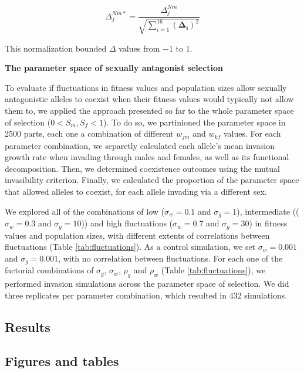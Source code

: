 \documentclass[]{article}
\begin{document}
\begin{equation}
  \Delta^{Nm*}_{j}= \frac{\Delta^{Nm}_{j}}{\sqrt{
    \sum\limits_{i=1}^{16} (\boldsymbol{\Delta_{i}})^{2} }}
\end{equation}

This normalization bounded $\Delta$ values from $-1$ to $1$.

\vspace{5mm}
\noindent\textbf{The parameter space of sexually antagonist selection}

To evaluate if fluctuations in fitness values and population sizes allow sexually antagonistic alleles to coexist when their fitness values would typically not allow them to, we applied the approach presented so far to the whole parameter space of selection  ($ 0 < S_{m}, S_{f} < 1$). To do so, we partinioned the parameter space in 2500 parts, each one a combination of different $w_{jm}$ and $w_{kf}$ values. For each parameter combination, we  separetly calculated each allele's mean invasion growth rate when invading through males and females, as well as its functional decomposition. Then, we determined coexistence outcomes using the mutual invasibility criterion. Finally, we calculated the proportion of the parameter space that allowed alleles to coexist, for each allele invading via a different sex.

We explored all of  the combinations of low ($\sigma_{w} = 0.1$ and $\sigma_{g}=1$), intermediate (($\sigma_{w} =  0.3$ and $\sigma_{g}=10$)) and high fluctuations ($\sigma_{w} = 0.7$ and $\sigma_{g}=30$) in fitness values and population sizes, with different extents of correlations between fluctuations (Table \ref{tab:fluctuations}).  As a control simulation, we set $\sigma_{w}= 0.001$ and  $\sigma_{g}=0.001$, with no correlation between fluctuations. For each one of the factorial combinations of $\sigma_{g}$, $\sigma_{w}$, $\rho_{g}$ and $\rho_{w}$ (Table \ref{tab:fluctuations}), we performed invasion simulations across the parameter space of selection. We did three replicates per parameter combination, which resulted in 432 simulations.


\clearpage
\subsection*{Results}



\clearpage
\subsection*{Figures and tables }
\end{document}
